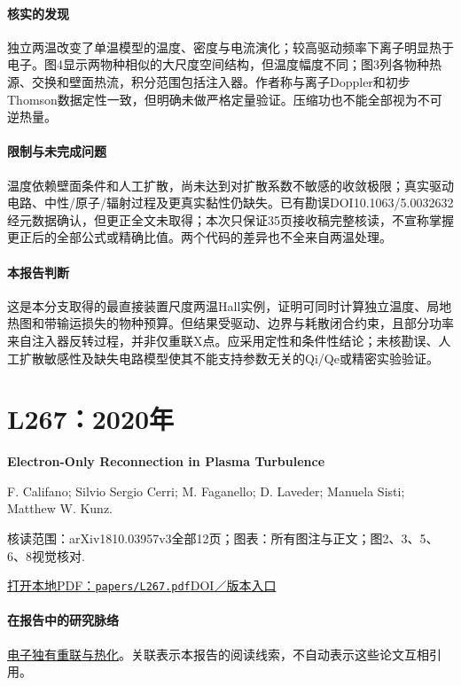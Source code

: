 \documentclass[UTF8,a4paper,11pt,openany,fontset=fandol]{ctexbook}
\begin{document}
\paragraph{核实的发现}独立两温改变了单温模型的温度、密度与电流演化；较高驱动频率下离子明显热于电子。图4显示两物种相似的大尺度空间结构，但温度幅度不同；图3列各物种热源、交换和壁面热流，积分范围包括注入器。作者称与离子Doppler和初步Thomson数据定性一致，但明确未做严格定量验证。压缩功也不能全部视为不可逆热量。

\paragraph{限制与未完成问题}温度依赖壁面条件和人工扩散，尚未达到对扩散系数不敏感的收敛极限；真实驱动电路、中性/原子/辐射过程及更真实黏性仍缺失。已有勘误DOI10.1063/5.0032632经元数据确认，但更正全文未取得；本次只保证35页接收稿完整核读，不宣称掌握更正后的全部公式或精确比值。两个代码的差异也不全来自两温处理。

\paragraph{本报告判断}这是本分支取得的最直接装置尺度两温Hall实例，证明可同时计算独立温度、局地热图和带输运损失的物种预算。但结果受驱动、边界与耗散闭合约束，且部分功率来自注入器反转过程，并非仅重联X点。应采用定性和条件性结论；未核勘误、人工扩散敏感性及缺失电路模型使其不能支持参数无关的Qi/Qe或精密实验验证。

\section{L267：2020年}\label{paper:L267}

\textbf{Electron-Only Reconnection in Plasma Turbulence}\citep{L267}\

F. Califano;  Silvio Sergio Cerri;  M. Faganello;  D. Laveder;  Manuela Sisti;  Matthew W. Kunz.

\textsf{核读范围：}arXiv1810.03957v3全部12页；\textsf{图表：}所有图注与正文；图2、3、5、6、8视觉核对.

\href{run:../papers/L267.pdf}{打开本地PDF：\texttt{papers/L267.pdf}}\quad\href{https://doi.org/10.3389/fphy.2020.00317}{DOI／版本入口}

\paragraph{在报告中的研究脉络}\hyperref[story:energy]{电子独有重联与热化}。关联表示本报告的阅读线索，不自动表示这些论文互相引用。
\end{document}
